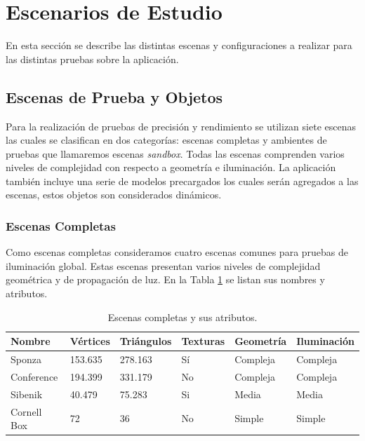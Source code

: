 \section{Escenarios de Estudio}

En esta sección se describe las distintas escenas y configuraciones a realizar para las distintas pruebas sobre la aplicación.

\subsection{Escenas de Prueba y Objetos}

Para la realización de pruebas de precisión y rendimiento se utilizan siete escenas las cuales se clasifican en dos categorías: escenas completas y ambientes de pruebas que llamaremos escenas \emph{sandbox}. Todas las escenas comprenden varios niveles de complejidad con respecto a geometría e iluminación. La aplicación también incluye una serie de modelos precargados los cuales serán agregados a las escenas, estos objetos son considerados dinámicos.

\subsubsection{Escenas Completas}

Como escenas completas consideramos cuatro escenas comunes para pruebas de iluminación global. Estas escenas presentan varios niveles de complejidad geométrica y de propagación de luz. En la Tabla \ref{tab:scenes_attributes} se listan sus nombres y atributos.

\begin{table}[h]
\centering
\begin{tabular}{|l|l|l|l|l|l|}
\hline
Nombre            & Vértices & Triángulos & Texturas & Geometría & Iluminación \\ \hline
Sponza     & 153.635  & 278.163    & Sí       & Compleja  & Compleja     \\ \hline
Conference   & 194.399  & 331.179    & No       & Compleja  & Compleja     \\ \hline
Sibenik & 40.479   & 75.283     & Si       & Media     & Media        \\ \hline
Cornell Box       & 72       & 36         & No       & Simple    & Simple       \\ \hline
\end{tabular}
\caption{Escenas completas y sus atributos.}
\label{tab:scenes_attributes}
\end{table}

